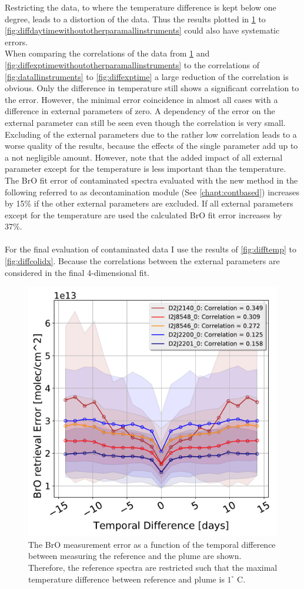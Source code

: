 \documentclass  [
  paper    = a4,
  BCOR     = 10mm,
  twoside,
  fontsize = 12pt,
  fleqn,
  toc      = bibnumbered,
  toc      = listofnumbered,
  numbers  = noendperiod,
  headings = normal,
  listof   = leveldown,
  version  = 3.03
]                                       {scrreprt}
\begin{document}
Restricting the data, to where the temperature difference is kept below one degree, leads to a distortion of the data. Thus the results plotted in \cref{fig:datwithoutotherparamallinstruments} to \cref{fig:diffdaytimewithoutotherparamallinstruments} could also have systematic errors.\\
When comparing the correlations of the data from \cref{fig:datwithoutotherparamallinstruments} and \cref{fig:diffexptimewithoutotherparamallinstruments}  to the correlations of 
\cref{fig:datallinstruments} to \cref{fig:diffexptime} a large reduction of the correlation is obvious. Only the difference in temperature still shows a significant correlation to the   error. However, the minimal   error coincidence in almost all cases with a difference in external parameters of zero. A dependency of the   error on the external parameter can still be seen even though the correlation is very small. \\
Excluding of the external parameters due to the rather low correlation leads to a worse quality of the results, because the effects of the single parameter add up to a not negligible amount. However, note that the added impact of all external parameter except for the temperature is less important than the temperature.
The BrO fit error of contaminated spectra evaluated with the new method in the following referred to as decontamination module (See \cref{chapt:contbased}) increases by 15\% if the other external parameters are excluded. If all external parameters except for the temperature are used the calculated BrO fit error increases by 37\%.\\
\\
For the final evaluation of contaminated data I use the results of \cref{fig:difftemp} to \cref{fig:diffcolidx}. Because the correlations between the external parameters are considered in the final 4-dimensional fit.\\
\begin{figure}[h]
	\centering
	\includegraphics[width=0.5\linewidth]{Bilder/BrOErr_OhnEVar/DatwithoutOtherparamallInstruments}
	\caption{The BrO measurement error as a function of the temporal difference between measuring the reference and the plume are shown. Therefore, the reference spectra are restricted such that the maximal temperature difference between reference and plume is $1^\circ$ C.}
	\label{fig:datwithoutotherparamallinstruments}
\end{figure}
\end{document}
